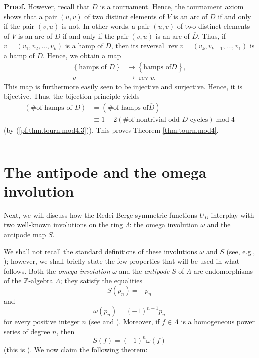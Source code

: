 \documentclass[numbers=enddot,12pt,final,onecolumn,notitlepage]{scrartcl}%
\numberwithin{exer}{section}
\theoremstyle{definition}
\newenvironment{proof}[1][Proof]{\noindent\textbf{#1.} }{\ \rule{0.5em}{0.5em}}
\begin{document}
\begin{proof}
However, recall that $D$ is a tournament. Hence, the tournament axiom shows
that a pair $\left(  u,v\right)  $ of two distinct elements of $V$ is an arc
of $D$ if and only if the pair $\left(  v,u\right)  $ is not. In other words,
a pair $\left(  u,v\right)  $ of two distinct elements of $V$ is an arc of $D$
if and only if the pair $\left(  v,u\right)  $ is an arc of $\overline{D}$.
Thus, if $v=\left(  v_{1},v_{2},\ldots,v_{k}\right)  $ is a hamp of $D$, then
its reversal $\operatorname*{rev}v=\left(  v_{k},v_{k-1},\ldots,v_{1}\right)
$ is a hamp of $\overline{D}$. Hence, we obtain a map%
\begin{align*}
\left\{  \text{hamps of }D\right\}   &  \rightarrow\left\{  \text{hamps of
}\overline{D}\right\}  ,\\
v  &  \mapsto\operatorname*{rev}v.
\end{align*}
This map is furthermore easily seen to be injective and surjective. Hence, it
is bijective. Thus, the bijection principle yields%
\begin{align*}
\left(  \text{\# of hamps of }D\right)   &  =\left(  \text{\# of hamps of
}\overline{D}\right) \\
&  \equiv1+2\left(  \text{\# of nontrivial odd }D\text{-cycles}\right)
\operatorname{mod}4
\end{align*}
(by (\ref{pf.thm.tourn.mod4.3})). This proves Theorem \ref{thm.tourn.mod4}.
\end{proof}

\section{\label{sec.antipode}The antipode and the omega involution}

Next, we will discuss how the Redei-Berge symmetric functions $U_{D}$
interplay with two well-known involutions on the ring $\Lambda$: the omega
involution $\omega$ and the antipode map $S$.

We shall not recall the standard definitions of these involutions $\omega$ and
$S$ (see, e.g., \cite[\S 2.4]{GriRei}); however, we shall briefly state the
few properties that will be used in what follows. Both the \emph{omega
involution} $\omega$ and the \emph{antipode }$S$ of $\Lambda$ are
endomorphisms of the $\mathbb{Z}$-algebra $\Lambda$; they satisfy the
equalities%
\begin{equation}
S\left(  p_{n}\right)  =-p_{n} \label{eq.def.antipode.S}%
\end{equation}
and%
\begin{equation}
\omega\left(  p_{n}\right)  =\left(  -1\right)  ^{n-1}p_{n}
\label{eq.def.antipode.omega}%
\end{equation}
for every positive integer $n$ (see \cite[Proposition 2.4.1 (i)]{GriRei} and
\cite[Proposition 2.4.3 (c)]{GriRei}). Moreover, if $f\in\Lambda$ is a
homogeneous power series of degree $n$, then%
\begin{equation}
S\left(  f\right)  =\left(  -1\right)  ^{n}\omega\left(  f\right)
\label{eq.def.antipode.Somega}%
\end{equation}
(this is \cite[Proposition 2.4.3 (e)]{GriRei}). We now claim the following theorem:
\end{document}

